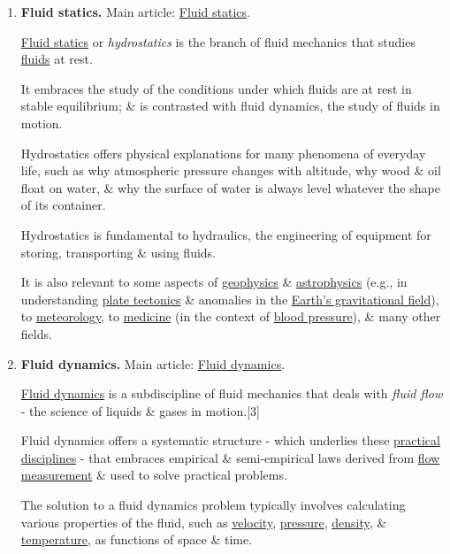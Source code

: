 \documentclass{article}
\begin{document}
\begin{enumerate}
	\item {\bf Fluid statics.} Main article: \href{https://en.wikipedia.org/wiki/Fluid_statics}{Fluid statics}.
	
	\href{https://en.wikipedia.org/wiki/Fluid_statics}{Fluid statics} or \textit{hydrostatics} is the branch of fluid mechanics that studies \href{https://en.wikipedia.org/wiki/Fluid}{fluids} at rest.
	
	It embraces the study of the conditions under which fluids are at rest in stable equilibrium; \& is contrasted with fluid dynamics, the study of fluids in motion.
	
	Hydrostatics offers physical explanations for many phenomena of everyday life, such as why atmospheric pressure changes with altitude, why wood \& oil float on water, \& why the surface of water is always level whatever the shape of its container.
	
	Hydrostatics is fundamental to hydraulics, the engineering of equipment for storing, transporting \& using fluids.
	
	It is also relevant to some aspects of \href{https://en.wikipedia.org/wiki/Geophysics}{geophysics} \& \href{https://en.wikipedia.org/wiki/Astrophysics}{astrophysics} (e.g., in understanding \href{https://en.wikipedia.org/wiki/Plate_tectonics}{plate tectonics} \& anomalies in the \href{https://en.wikipedia.org/wiki/Gravity_of_Earth}{Earth's gravitational field}), to \href{https://en.wikipedia.org/wiki/Meteorology}{meteorology}, to \href{https://en.wikipedia.org/wiki/Medicine}{medicine} (in the context of \href{https://en.wikipedia.org/wiki/Blood_pressure}{blood pressure}), \& many other fields.
	\item {\bf Fluid dynamics.} Main article: \href{https://en.wikipedia.org/wiki/Fluid_dynamics}{Fluid dynamics}.
	
	\href{https://en.wikipedia.org/wiki/Fluid_dynamics}{Fluid dynamics} is a subdiscipline of fluid mechanics that deals with \textit{fluid flow} - the science of liquids \& gases in motion.[3]
	
	Fluid dynamics offers a systematic structure - which underlies these \href{https://en.wikipedia.org/wiki/Practical_disciplines}{practical disciplines} - that embraces empirical \& semi-empirical laws derived from \href{https://en.wikipedia.org/wiki/Flow_measurement}{flow measurement} \& used to solve practical problems.
	
	The solution to a fluid dynamics problem typically involves calculating various properties of the fluid, such as \href{https://en.wikipedia.org/wiki/Velocity}{velocity}, \href{https://en.wikipedia.org/wiki/Pressure}{pressure}, \href{https://en.wikipedia.org/wiki/Density}{density}, \& \href{https://en.wikipedia.org/wiki/Temperature}{temperature}, as functions of space \& time.
	

\end{enumerate}
\end{document}
